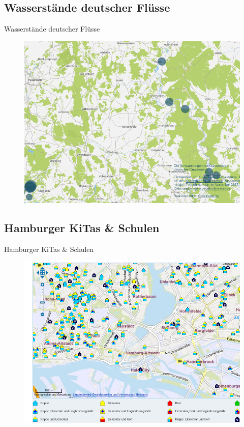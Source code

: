 \subsection{Wasserstände deutscher Flüsse}
\begin{frame}[t]{Wasserstände deutscher Flüsse}
\begin{figure}[h]
 \centering
 \includegraphics[scale=0.3]{section_other_ok_labs_rivers.png}
\end{figure}
\end{frame}

\subsection{Hamburger KiTas \& Schulen}
\begin{frame}[t]{Hamburger KiTas \& Schulen}
\begin{figure}[h]
 \centering
 \includegraphics[scale=0.3]{section_other_ok_labs_schools.png}
\end{figure}
\end{frame}

